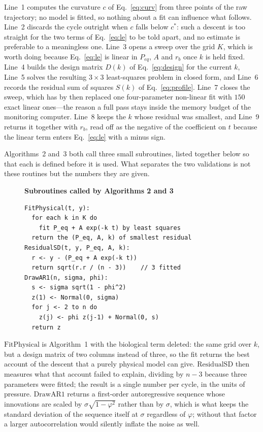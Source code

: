 \documentclass[sigconf]{acmart}
\newcommand{\rb}{\ensuremath{r_{b}}}
\begin{document}
Line~1 computes the curvature
$c$ of Eq.~\eqref{eq:curv} from three points of the raw trajectory; no
model is fitted, so nothing about a fit can influence what follows.
Line~2 discards the cycle outright when $c$ falls below $c^{*}$: such a
descent is too straight for the two terms of Eq.~\eqref{eq:le} to be
told apart, and no estimate is preferable to a meaningless one.
Line~3 opens a sweep over the grid $K$, which is worth doing because
Eq.~\eqref{eq:le} is linear in $P_{eq}$, $A$ and \rb{} once $k$ is
held fixed. Line~4 builds the design matrix $D(k)$ of
Eq.~\eqref{eq:design} for the current $k$, Line~5 solves the resulting
$3\times3$ least-squares problem in closed form, and Line~6 records the
residual sum of squares $S(k)$ of Eq.~\eqref{eq:profile}. Line~7 closes
the sweep, which has by then replaced one four-parameter non-linear
fit with $150$ exact linear ones---the reason a full pass stays inside
the memory budget of the monitoring computer. Line~8 keeps the $k$
whose residual was smallest, and Line~9 returns it together with
\rb{}, read off as the negative of the coefficient on $t$ because the
linear term enters Eq.~\eqref{eq:le} with a minus sign.

Algorithms~2 and~3 both call three small subroutines, listed together
below so that each is defined before it is used. What separates the two
validations is not these routines but the numbers they are given.

\begin{figure}[t]
\noindent\textbf{Subroutines called by Algorithms 2 and 3}

\begin{verbatim}
FitPhysical(t, y):
  for each k in K do
    fit P_eq + A exp(-k t) by least squares
  return the (P_eq, A, k) of smallest residual
ResidualSD(t, y, P_eq, A, k):
  r <- y - (P_eq + A exp(-k t))
  return sqrt(r.r / (n - 3))    // 3 fitted
DrawAR1(n, sigma, phi):
  s <- sigma sqrt(1 - phi^2)
  z(1) <- Normal(0, sigma)
  for j <- 2 to n do
    z(j) <- phi z(j-1) + Normal(0, s)
  return z
\end{verbatim}
\end{figure}

$\mathrm{FitPhysical}$ is Algorithm~1 with the biological term deleted:
the same grid over $k$, but a design matrix of two columns instead of
three, so the fit returns the best account of the descent that a purely
physical model can give. $\mathrm{ResidualSD}$ then measures what that
account failed to explain, dividing by $n-3$ because three parameters
were fitted; the result is a single number per cycle, in the units of
pressure. $\mathrm{DrawAR1}$ returns a first-order autoregressive
sequence whose innovations are scaled by $\sigma\sqrt{1-\varphi^{2}}$
rather than by $\sigma$, which is what keeps the standard deviation of
the sequence itself at $\sigma$ regardless of $\varphi$; without that
factor a larger autocorrelation would silently inflate the noise as
well.
\end{document}
